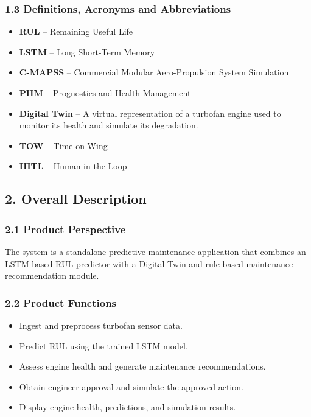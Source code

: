 \documentclass[12pt,a4paper]{report}
\begin{document}
\subsubsection*{1.3 Definitions, Acronyms and Abbreviations}
\begin{itemize}
    \item \textbf{RUL} -- Remaining Useful Life
    \item \textbf{LSTM} -- Long Short-Term Memory
    \item \textbf{C-MAPSS} -- Commercial Modular Aero-Propulsion System Simulation
    \item \textbf{PHM} -- Prognostics and Health Management
    \item \textbf{Digital Twin} -- A virtual representation of a turbofan engine used to monitor its health and simulate its degradation.
    \item \textbf{TOW} -- Time-on-Wing
    \item \textbf{HITL} -- Human-in-the-Loop
\end{itemize}

\subsection*{2. Overall Description}

\subsubsection*{2.1 Product Perspective}
The system is a standalone predictive maintenance application that combines an LSTM-based RUL predictor with a Digital Twin and rule-based maintenance recommendation module.

\subsubsection*{2.2 Product Functions}
\begin{itemize}
    \item Ingest and preprocess turbofan sensor data.
    \item Predict RUL using the trained LSTM model.
    \item Assess engine health and generate maintenance recommendations.
    \item Obtain engineer approval and simulate the approved action.
    \item Display engine health, predictions, and simulation results.
\end{itemize}
\end{document}
